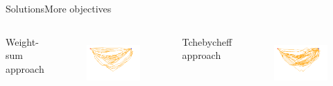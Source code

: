 \begin{frame}{Solutions}{More objectives}
\begin{columns}
	{ Weight-sum approach}
	\begin{figure}
		\centering
		\includegraphics[width=\linewidth]{figure/sim6-3obj/MORRTstar02-ALL.png}
		\label{fig:sim:03:sol1}
	\end{figure}
	{ Tchebycheff approach}
	\begin{figure}
		\centering
		\includegraphics[width=\linewidth]{figure/sim7-3obj/MORRTstar02-ALL.png}
		\label{fig:sim:03:sol2}
	\end{figure}
\end{columns}
\end{frame}

